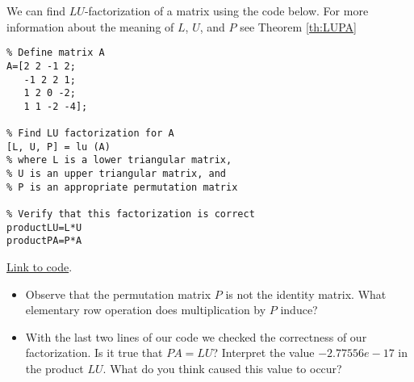 \documentclass{ximera}
\begin{document}
\begin{template}\label{temp:LU}
We can find $LU$-factorization of a matrix using the code below.  For more information about the meaning of $L$, $U$, and $P$ see Theorem \ref{th:LUPA}  

\begin{verbatim}
% Define matrix A
A=[2 2 -1 2;
   -1 2 2 1;
   1 2 0 -2;
   1 1 -2 -4];
   
% Find LU factorization for A   
[L, U, P] = lu (A)
% where L is a lower triangular matrix,
% U is an upper triangular matrix, and
% P is an appropriate permutation matrix

% Verify that this factorization is correct
productLU=L*U
productPA=P*A
\end{verbatim}

\href{https://sagecell.sagemath.org/?z=eJxtjrFqwzAURXeB_-EugTbYEJtuxYOgdNLgRV1CBmHLjcCRxKtEmn59n-y0UCgC8Y507uPu8GJn5y0uJpH7hKyE7I8dOjQtuudKAOvEp92owAFN90Mtz2ieThtXYodX5ycojdmMKZD7MskFjzkQ5GocVQ1dYzihx5LxIB9L6nq2ZKHgPmCwhKslcCPj3_Ni6F6vLqJeFY8c478O_03FG-6eiZFCZC1ZcOKS01Zo0ytR3DdLbr4hnU3ii3N_u_PDGIjsmCrBy6Y8JqV7tde_OMh-2Mtvdaxh4w==&lang=octave&interacts=eJyLjgUAARUAuQ==}{Link to code}.

\begin{remark}
\begin{itemize}
\item Observe that the permutation matrix $P$ is not the identity matrix.  What elementary row operation does multiplication by $P$ induce?
    \item With the last two lines of our code we checked the correctness of our factorization.  Is it true that $PA=LU$?  Interpret the value $-2.77556e-17$ in the product $LU$.  What do you think caused this value to occur?  
\end{itemize}
    \end{remark}
    
\end{template}
\end{document}
